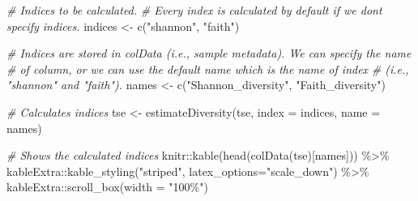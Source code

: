 \documentclass[
  oneside]{book}
\newenvironment{Shaded}{\begin{snugshade}}{\end{snugshade}}
\newcommand{\AttributeTok}[1]{\textcolor[rgb]{0.77,0.63,0.00}{#1}}
\newcommand{\CommentTok}[1]{\textcolor[rgb]{0.56,0.35,0.01}{\textit{#1}}}
\newcommand{\FunctionTok}[1]{\textcolor[rgb]{0.00,0.00,0.00}{#1}}
\newcommand{\NormalTok}[1]{#1}
\newcommand{\OtherTok}[1]{\textcolor[rgb]{0.56,0.35,0.01}{#1}}
\newcommand{\SpecialCharTok}[1]{\textcolor[rgb]{0.00,0.00,0.00}{#1}}
\newcommand{\StringTok}[1]{\textcolor[rgb]{0.31,0.60,0.02}{#1}}
\begin{document}
\begin{Shaded}
\begin{Highlighting}[]
\CommentTok{\# Indices to be calculated. }
\CommentTok{\# Every index is calculated by default if we don\textquotesingle{}t specify indices.}
\NormalTok{indices }\OtherTok{\textless{}{-}} \FunctionTok{c}\NormalTok{(}\StringTok{"shannon"}\NormalTok{, }\StringTok{"faith"}\NormalTok{)}

\CommentTok{\# Indices are stored in colData (i.e., sample metadata). We can specify the name}
\CommentTok{\# of column, or we can use the default name which is the name of index }
\CommentTok{\# (i.e., "shannon" and "faith"). }
\NormalTok{names }\OtherTok{\textless{}{-}} \FunctionTok{c}\NormalTok{(}\StringTok{"Shannon\_diversity"}\NormalTok{, }\StringTok{"Faith\_diversity"}\NormalTok{)}

\CommentTok{\# Calculates indices}
\NormalTok{tse }\OtherTok{\textless{}{-}} \FunctionTok{estimateDiversity}\NormalTok{(tse, }\AttributeTok{index =}\NormalTok{ indices, }\AttributeTok{name =}\NormalTok{ names)}

\CommentTok{\# Shows the calculated indices}
\NormalTok{knitr}\SpecialCharTok{::}\FunctionTok{kable}\NormalTok{(}\FunctionTok{head}\NormalTok{(}\FunctionTok{colData}\NormalTok{(tse)[names])) }\SpecialCharTok{\%\textgreater{}\%} 
\NormalTok{  kableExtra}\SpecialCharTok{::}\FunctionTok{kable\_styling}\NormalTok{(}\StringTok{"striped"}\NormalTok{, }
                            \AttributeTok{latex\_options=}\StringTok{"scale\_down"}\NormalTok{) }\SpecialCharTok{\%\textgreater{}\%} 
\NormalTok{  kableExtra}\SpecialCharTok{::}\FunctionTok{scroll\_box}\NormalTok{(}\AttributeTok{width =} \StringTok{"100\%"}\NormalTok{)}
\end{Highlighting}
\end{Shaded}

\begin{table}
\centering
{}
\end{table}
\end{document}
